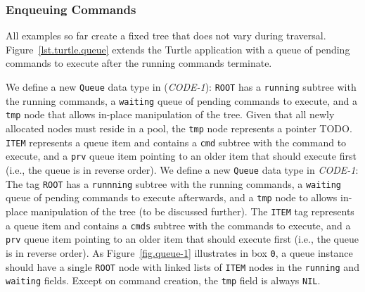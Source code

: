 \documentclass{sig-alternate}
\newcommand{\code}[1] {{\small{\texttt{#1}}}}
\begin{document}
\subsubsection{Enqueuing Commands}
\label{sub.enqueuing}

All examples so far create a fixed tree that does not vary during traversal.
%
Figure~\ref{lst.turtle.queue} extends the Turtle application with a queue of 
pending commands to execute after the running commands terminate.

We define a new \code{Queue} data type in (\emph{CODE-1}):
\code{ROOT} has a \code{running} subtree with the running commands, a 
\code{waiting} queue of pending commands to execute, and a \code{tmp} node that 
allows in-place manipulation of the tree.
Given that all newly allocated nodes must reside in a pool, the \code{tmp} node 
represents a pointer TODO.
\code{ITEM} represents a queue item and contains a \code{cmd} subtree with the 
command to execute, and a \code{prv} queue item pointing to an older item that 
should execute first (i.e., the queue is in reverse order).
%
We define a new \code{Queue} data type in \emph{CODE-1}:
The tag \code{ROOT} has a \code{runnning} subtree with the running commands, a 
\code{waiting} queue of pending commands to execute afterwards, and a 
\code{tmp} node to allows in-place manipulation of the tree (to be discussed 
further).
%
The \code{ITEM} tag represents a queue item and contains a \code{cmds} subtree 
with the commands to execute, and a \code{prv} queue item pointing to an older 
item that should execute first (i.e., the queue is in reverse order).
%
As Figure~\ref{fig.queue-1} illustrates in box \code{0}, a queue instance 
should have a single \code{ROOT} node with linked lists of \code{ITEM} nodes in 
the \code{running} and \code{waiting} fields.
Except on command creation, the \code{tmp} field is always \code{NIL}.
\end{document}
